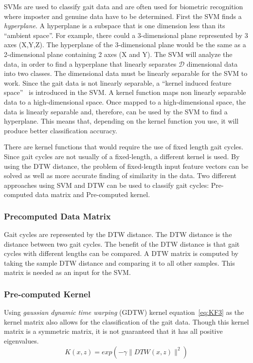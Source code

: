 \documentclass{sig-alternate}
\begin{document}
	SVMs are used to classify gait data and are often used for biometric recognition where imposter and genuine data have to be determined. First the SVM finds a \textit{hyperplane}. A hyperplane is a subspace that is one dimension less than its ``ambient space''. For example, there could a 3-dimensional plane represented by 3 axes (X,Y,Z). The hyperplane of the 3-dimensional plane would be the same as a 2-dimensional plane containing 2 axes (X and Y). The SVM will analyze the data, in order to find a hyperplane that linearly separates \begin{math}\mathcal{D} \end{math} dimensional data into two classes. The dimensional data must be linearly separable for the SVM to work. Since the gait data is not linearly separable, a ``kernel induced feature space''~\cite{Muaaz:2013} is introduced in the SVM. A kernel function maps non linearly separable data to a high-dimensional space. Once mapped to a high-dimensional space, the data is linearly separable and, therefore, can be used by the SVM to find a hyperplane. This means that, depending on the kernel function you use, it will produce better classification accuracy. 

There are kernel functions that would require the use of fixed length gait cycles. Since gait cycles are not usually of a fixed-length, a different kernel is used. By using the DTW distance, the problem of fixed-length input feature vectors can be solved as well as more accurate finding of similarity in the data. Two different approaches using SVM and DTW can be used to classify gait cycles: Pre-computed data matrix and Pre-computed kernel.

\subsubsection*{Precomputed Data Matrix}
	Gait cycles are represented by the DTW distance. The DTW distance is the distance between two gait cycles. The benefit of the DTW distance is that gait cycles with different lengths can be compared. A DTW matrix is computed by taking the sample DTW distance and comparing it to all other samples. This matrix is needed as an input for the SVM.	

\subsubsection*{Pre-computed Kernel}
Using \textit{gaussian dynamic time warping} (GDTW) kernel equation~\eqref{eq:KF3} as the kernel matrix also allows for the classification of the gait data. Though this kernel matrix is a symmetric matrix, it is not guaranteed that it has all positive eigenvalues. 
\begin{equation} \label{eq:KF3}
K(x,z)=exp(-\gamma \parallel DTW(x,z) \parallel ^2)
\end{equation}	
\end{document}
